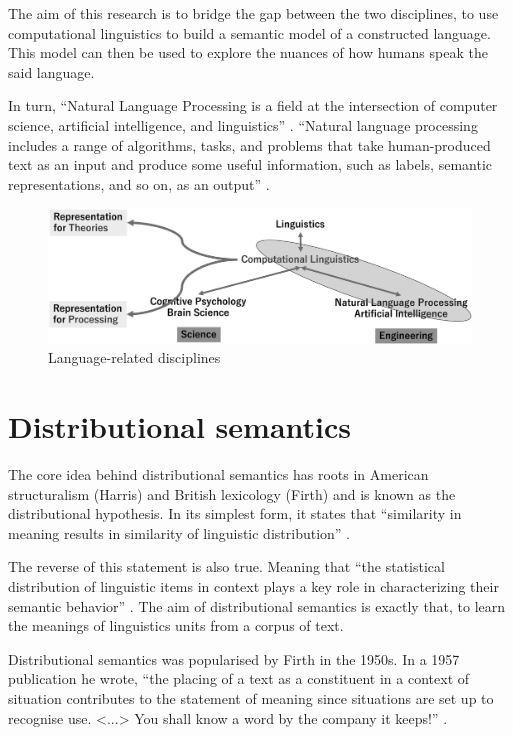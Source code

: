 \documentclass[14pt, a4paper]{extreport}
\begin{document}
The aim of this research is to bridge the gap between the two disciplines, to use computational linguistics to build a semantic model of a constructed language. This model can then be used to explore the nuances of how humans speak the said language.

In turn, ``Natural Language Processing is a field at the intersection of computer science, artificial intelligence, and linguistics'' \parencite[7]{practicalnlp}. ``Natural language processing includes a range of algorithms, tasks, and problems that take human-produced text as an input and produce some useful information, such as labels, semantic representations, and so on, as an output'' \parencite[4]{realworldnlp}.

\begin{figure}[ht]
\bigskip
\includegraphics[width=14cm]{nlpcl}
\centering
\caption{Language-related disciplines \parencite{nlpandcl}}
\end{figure}


\section{Distributional semantics}

The core idea behind distributional semantics has roots in American structuralism (Harris) and British lexicology (Firth) and is known as the distributional hypothesis. In its simplest form, it states that ``similarity in meaning results in similarity of linguistic distribution'' \parencite{harris}.

The reverse of this statement is also true. Meaning that ``the statistical distribution of linguistic items in context plays a key role in characterizing their semantic behavior'' \parencite{lenci}. The aim of distributional semantics is exactly that, to learn the meanings of linguistics units from a corpus of text.

Distributional semantics was popularised by Firth in the 1950s. In a 1957 publication he wrote, ``the placing of a text as a constituent in a context of situation contributes to the statement of meaning since situations are set up to recognise use. <...> You shall know a word by the company it keeps!'' \parencite[11]{firth}.
\end{document}
